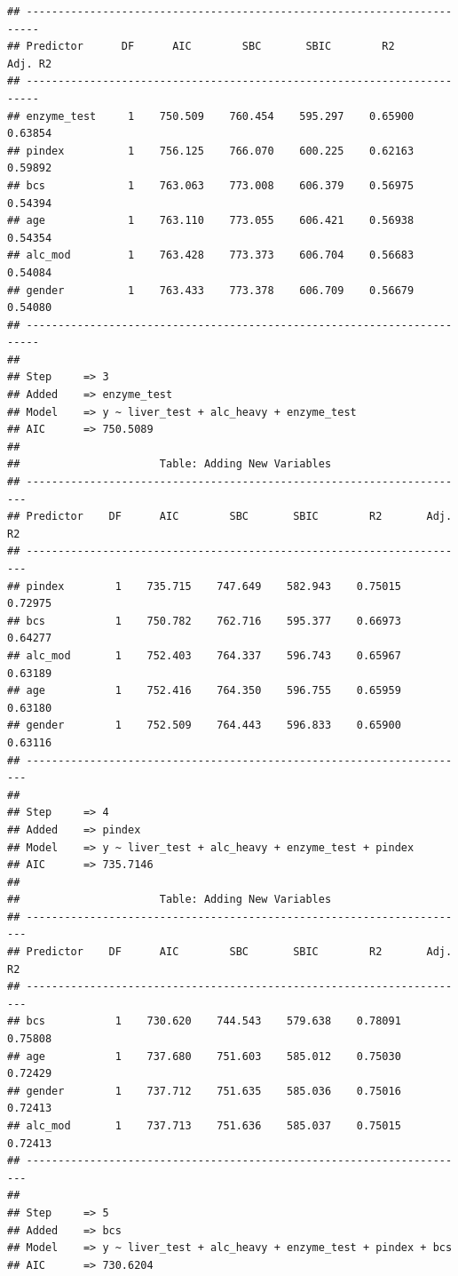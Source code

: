 \documentclass[
]{book}
\begin{document}
\begin{verbatim}
## ------------------------------------------------------------------------
## Predictor      DF      AIC        SBC       SBIC        R2       Adj. R2 
## ------------------------------------------------------------------------
## enzyme_test     1    750.509    760.454    595.297    0.65900    0.63854 
## pindex          1    756.125    766.070    600.225    0.62163    0.59892 
## bcs             1    763.063    773.008    606.379    0.56975    0.54394 
## age             1    763.110    773.055    606.421    0.56938    0.54354 
## alc_mod         1    763.428    773.373    606.704    0.56683    0.54084 
## gender          1    763.433    773.378    606.709    0.56679    0.54080 
## ------------------------------------------------------------------------
## 
## Step     => 3 
## Added    => enzyme_test 
## Model    => y ~ liver_test + alc_heavy + enzyme_test 
## AIC      => 750.5089 
## 
##                      Table: Adding New Variables                       
## ----------------------------------------------------------------------
## Predictor    DF      AIC        SBC       SBIC        R2       Adj. R2 
## ----------------------------------------------------------------------
## pindex        1    735.715    747.649    582.943    0.75015    0.72975 
## bcs           1    750.782    762.716    595.377    0.66973    0.64277 
## alc_mod       1    752.403    764.337    596.743    0.65967    0.63189 
## age           1    752.416    764.350    596.755    0.65959    0.63180 
## gender        1    752.509    764.443    596.833    0.65900    0.63116 
## ----------------------------------------------------------------------
## 
## Step     => 4 
## Added    => pindex 
## Model    => y ~ liver_test + alc_heavy + enzyme_test + pindex 
## AIC      => 735.7146 
## 
##                      Table: Adding New Variables                       
## ----------------------------------------------------------------------
## Predictor    DF      AIC        SBC       SBIC        R2       Adj. R2 
## ----------------------------------------------------------------------
## bcs           1    730.620    744.543    579.638    0.78091    0.75808 
## age           1    737.680    751.603    585.012    0.75030    0.72429 
## gender        1    737.712    751.635    585.036    0.75016    0.72413 
## alc_mod       1    737.713    751.636    585.037    0.75015    0.72413 
## ----------------------------------------------------------------------
## 
## Step     => 5 
## Added    => bcs 
## Model    => y ~ liver_test + alc_heavy + enzyme_test + pindex + bcs 
## AIC      => 730.6204 

\end{verbatim}
\end{document}
